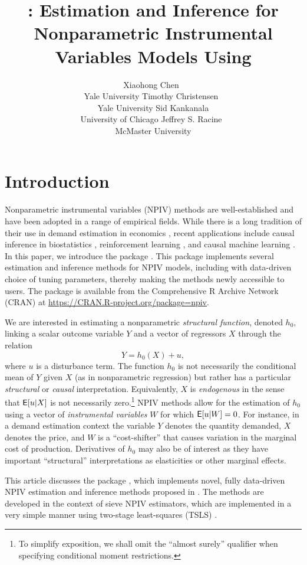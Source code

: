 \documentclass[
]{jss}
\author{
Xiaohong Chen~\orcidlink{0000-0003-1125-675X}\\Yale
University \And Timothy
Christensen~\orcidlink{0000-0002-4639-5015}\\Yale University
\AND Sid Kankanala\\University of Chicago \And Jeffrey S.
Racine~\orcidlink{0000-0002-5680-3705}\\McMaster University
}
\title{\pkg{npiv}: Estimation and Inference for Nonparametric
Instrumental Variables Models Using \proglang{R}}
\begin{document}
\section{Introduction}\label{introduction}

Nonparametric instrumental variables (NPIV) methods are well-established
and have been adopted in a range of empirical fields. While there is a
long tradition of their use in demand estimation in economics
\citep{BCK, BHP, BerryHaile2014}, recent applications include causal
inference in biostatistics \citep{WangZhiTT2018}, reinforcement learning
\citep{chen2022well, grettonRL2021}, and causal machine learning
\citep{causalML}. In this paper, we introduce the  \citep{R}
package  \citep{NPIV}. This package implements several
estimation and inference methods for NPIV models, including with
data-driven choice of tuning parameters, thereby making the methods
newly accessible to  users. The package  is
available from the Comprehensive R Archive Network (CRAN) at
\url{https://CRAN.R-project.org/package=npiv}.

We are interested in estimating a nonparametric \emph{structural
function}, denoted \(h_0\), linking a scalar outcome variable \(Y\) and
a vector of regressors \(X\) through the relation
\begin{equation}\label{eq:npiv}
 Y = h_0(X) + u,
\end{equation} where \(u\) is a disturbance term. The function \(h_0\)
is not necessarily the conditional mean of \(Y\) given \(X\) (as in
nonparametric regression) but rather has a particular \emph{structural}
or \emph{causal} interpretation. Equivalently, \(X\) is
\emph{endogenous} in the sense that \(\mathsf{E}[u|X]\) is not necessarily
zero.\footnote{To simplify exposition, we shall omit the ``almost
  surely'' qualifier when specifying conditional moment restrictions.}
NPIV methods allow for the estimation of \(h_0\) using a vector of
\emph{instrumental variables} \(W\) for which \(\mathsf{E}[u|W] = 0\). For
instance, in a demand estimation context the variable \(Y\) denotes the
quantity demanded, \(X\) denotes the price, and \(W\) is a
``cost-shifter'' that causes variation in the marginal cost of
production. Derivatives of \(h_0\) may also be of interest as they have
important ``structural'' interpretations as elasticities or other
marginal effects.

This article discusses the  package , which
implements novel, fully data-driven NPIV estimation and inference
methods proposed in \citet{CCK}. The methods are developed in the
context of sieve NPIV estimators, which are implemented in a very simple
manner using two-stage least-squares (TSLS) \citep{AC, NP}.
\end{document}
